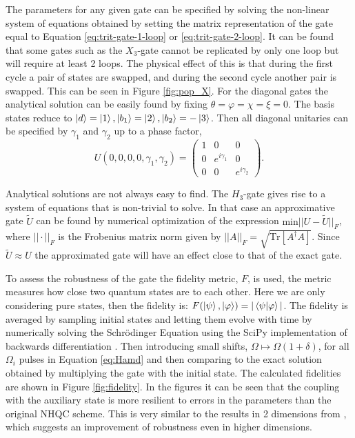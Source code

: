 The parameters for any given gate can be specified by solving the non-linear system of equations obtained by setting the matrix representation of the gate equal to Equation \ref{eq:trit-gate-1-loop} or \ref{eq:trit-gate-2-loop}. It can be found that some gates such as the $X_3$-gate cannot be replicated by only one loop but will require at least 2 loops. The physical effect of this is that during the first cycle a pair of states are swapped, and during the second cycle another pair is swapped. This can be seen in Figure \ref{fig:pop_X}. For the diagonal gates the analytical solution can be easily found by fixing $\theta = \varphi = \chi = \xi = 0$. The basis states reduce to $\ket{d} = \ket{1}, \ket{b_1} = \ket{2}, \ket{b_2} = -\ket{3}$. Then all diagonal unitaries can be specified by $\gamma_1$ and $\gamma_2$ up to a phase factor,
\begin{equation}
U(0,0,0,0,\gamma_1,\gamma_2) = \begin{pmatrix}
1&0&0
\\
0&e^{i\gamma_1}&0
\\
0&0&e^{i\gamma_2}
\end{pmatrix}.
\end{equation}

Analytical solutions are not always easy to find. The $H_3$-gate gives rise to a system of equations that is non-trivial to solve. 
In that case an approximative gate $\tilde{U}$ can be found by numerical optimization of the expression $\text{min}||U-\tilde{U}||_F$, where $||\cdot||_F$ is the Frobenius matrix norm given by $||A||_F = \sqrt{\text{Tr}\left[A^\dagger A \right]}$. Since $\tilde{U} \approx U$ the approximated gate will have an effect close to that of the exact gate.

To assess the robustness of the gate the fidelity metric, $F$, is used, the metric measures how close two quantum states are to each other. Here we are only considering pure states, then the fidelity is: $F(\ket{\psi},\ket{\varphi}) = |\bra{\psi}\ket{\varphi}|$. The fidelity is averaged by sampling initial states and letting them evolve with time by numerically solving the Schrödinger Equation using the SciPy implementation of backwards differentiation \cite{BDF}. Then introducing small shifts, $\Omega \mapsto \Omega(1 + \delta)$, for all $\Omega_i$ pulses in Equation \ref{eq:Hamd} and then comparing to the exact solution obtained by multiplying the gate with the initial state. The calculated fidelities are shown in Figure \ref{fig:fidelity}. In the figures it can be seen that the coupling with the auxiliary state is more resilient to errors in the parameters than the original NHQC scheme. This is very similar to the results in 2 dimensions from \cite{darkpath}, which suggests an improvement of robustness even in higher dimensions.

